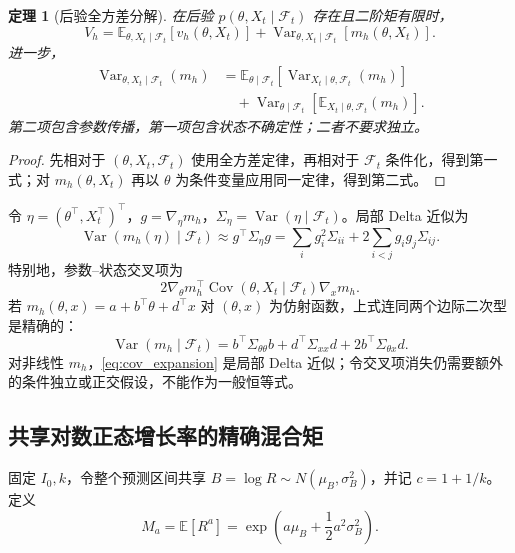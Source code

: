 \documentclass[11pt,a4paper]{article}
\newtheorem{theorem}{定理}[section]
\theoremstyle{remark}
\newcommand{\E}{\mathbb{E}}
\newcommand{\Var}{\operatorname{Var}}
\newcommand{\Cov}{\operatorname{Cov}}
\begin{document}
\begin{theorem}[后验全方差分解]
在后验 $p(\theta,X_t\mid\mathcal F_t)$ 存在且二阶矩有限时，
\begin{equation}
V_h=\E_{\theta,X_t\mid\mathcal F_t}[v_h(\theta,X_t)]
+\Var_{\theta,X_t\mid\mathcal F_t}[m_h(\theta,X_t)].\label{eq:posterior_total}
\end{equation}
进一步，
\begin{align}
\Var_{\theta,X_t\mid\mathcal F_t}(m_h)
&=\E_{\theta\mid\mathcal F_t}\!\left[
\Var_{X_t\mid\theta,\mathcal F_t}(m_h)\right]\nonumber\\
&\quad+\Var_{\theta\mid\mathcal F_t}\!\left[
\E_{X_t\mid\theta,\mathcal F_t}(m_h)\right].\label{eq:posterior_nested}
\end{align}
第二项包含参数传播，第一项包含状态不确定性；二者不要求独立。
\end{theorem}
\begin{proof}
先相对于 $(\theta,X_t,\mathcal F_t)$ 使用全方差定律，再相对于 $\mathcal F_t$ 条件化，得到第一式；对 $m_h(\theta,X_t)$ 再以 $\theta$ 为条件变量应用同一定律，得到第二式。
\end{proof}

令 $\eta=(\theta^\top,X_t^\top)^\top$，$g=\nabla_\eta m_h$，$\Sigma_\eta=\Var(\eta\mid\mathcal F_t)$。局部 Delta 近似为
\begin{equation}
\Var(m_h(\eta)\mid\mathcal F_t)\approx g^\top\Sigma_\eta g
=\sum_i g_i^2\Sigma_{ii}+2\sum_{i<j}g_ig_j\Sigma_{ij}.\label{eq:cov_expansion}
\end{equation}
特别地，参数--状态交叉项为
\begin{equation}
2\nabla_\theta m_h^\top\Cov(\theta,X_t\mid\mathcal F_t)\nabla_xm_h.
\end{equation}
若 $m_h(\theta,x)=a+b^\top\theta+d^\top x$ 对 $(\theta,x)$ 为仿射函数，上式连同两个边际二次型是精确的：
\begin{equation}
\Var(m_h\mid\mathcal F_t)
=b^\top\Sigma_{\theta\theta}b+d^\top\Sigma_{xx}d
+2b^\top\Sigma_{\theta x}d.
\label{eq:affine_cov_exact}
\end{equation}
对非线性 $m_h$，\eqref{eq:cov_expansion} 是局部 Delta 近似；令交叉项消失仍需要额外的条件独立或正交假设，不能作为一般恒等式。

\subsection{共享对数正态增长率的精确混合矩}
固定 $I_0,k$，令整个预测区间共享 $B=\log R\sim N(\mu_B,\sigma_B^2)$，并记 $c=1+1/k$。定义
\begin{equation}
M_a=\E[R^a]=\exp\left(a\mu_B+\frac12a^2\sigma_B^2\right).
\label{eq:lognormal_moment}
\end{equation}
\end{document}
